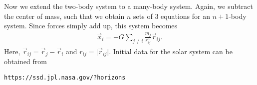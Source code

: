 \begin{example}
  Now we extend the two-body system to a many-body system. Again, we
  subtract the center of mass, such that we obtain $n$ sets of 3
  equations for an $n+1$-body system. Since forces simply add up, this
  system becomes
  \begin{gather}
    \label{eq:celestial}
    \vec x_i = -G \sum_{j\neq i} \frac{m_j}{r_{ij}^3} \vec r_{ij}.
  \end{gather}
  Here, $\vec r_{ij} = \vec r_j - \vec r_i$ and $r_{ij} = \lvert \vec r_{ij}\rvert$.
  Initial data for the solar system can be obtained from
  \begin{center}
    \texttt{https://ssd.jpl.nasa.gov/?horizons}
  \end{center}
\end{example}

